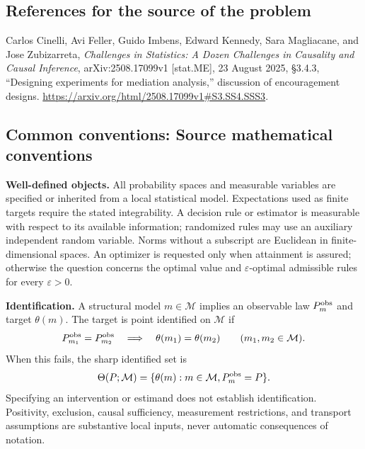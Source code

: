 \documentclass[11pt,a4paper]{article}
\begin{document}
\subsection*{References for the source of the problem}
Carlos Cinelli, Avi Feller, Guido Imbens, Edward Kennedy, Sara Magliacane, and Jose Zubizarreta, \emph{Challenges in Statistics: A Dozen Challenges in Causality and Causal Inference}, arXiv:2508.17099v1 [stat.ME], 23 August 2025, \S3.4.3, ``Designing experiments for mediation analysis,'' discussion of encouragement designs. \url{https://arxiv.org/html/2508.17099v1#S3.SS4.SSS3}.

\subsection*{Common conventions: Source mathematical conventions}

\textbf{Well-defined objects.}
All probability spaces and measurable variables are specified or inherited
from a local statistical model. Expectations used as finite targets require
the stated integrability. A decision rule or estimator is measurable with
respect to its available information; randomized rules may use an auxiliary
independent random variable. Norms without a subscript are Euclidean in
finite-dimensional spaces. An optimizer is requested only when attainment
is assured; otherwise the question concerns the optimal value and
$\varepsilon$-optimal admissible rules for every $\varepsilon>0$.

\textbf{Identification.}
A structural model $m\in\mathcal M$ implies an observable law
$P_m^{\rm obs}$ and target $\theta(m)$. The target is point identified on
$\mathcal M$ if
\[
 P_{m_1}^{\rm obs}=P_{m_2}^{\rm obs}
 \quad\Longrightarrow\quad\theta(m_1)=\theta(m_2)
 \qquad(m_1,m_2\in\mathcal M).
\]
When this fails, the sharp identified set is
\[
 \Theta(P;\mathcal M)=\{\theta(m):m\in\mathcal M,
                                  P_m^{\rm obs}=P\}.
\]
Specifying an intervention or estimand does not establish identification.
Positivity, exclusion, causal sufficiency, measurement restrictions, and
transport assumptions are substantive local inputs, never automatic
consequences of notation.
\end{document}
